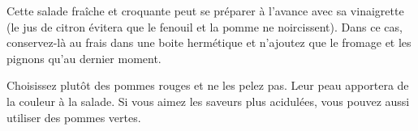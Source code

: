 \begin{conseils}
Cette salade fraîche et croquante peut se préparer à l'avance avec sa vinaigrette (le jus de citron évitera que le fenouil et la pomme ne noircissent). Dans ce cas, conservez-là au frais dans une boite hermétique et n'ajoutez que le fromage et les pignons qu'au dernier moment.

Choisissez plutôt des pommes rouges et ne les pelez pas. Leur peau apportera de la couleur à la salade. Si vous aimez les saveurs plus acidulées, vous pouvez aussi utiliser des pommes vertes.
\end{conseils}
